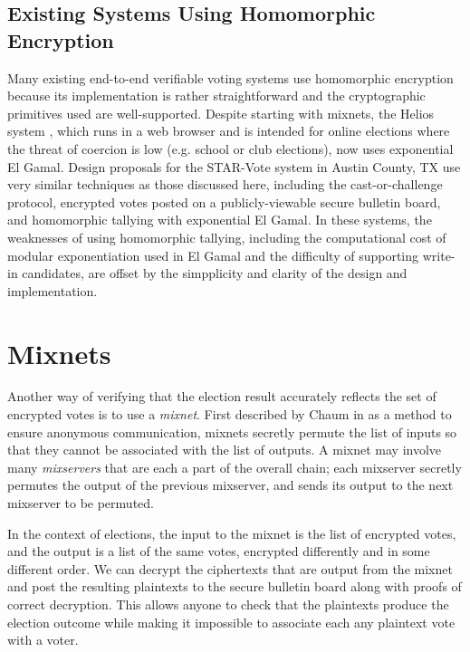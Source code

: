 \subsection{Existing Systems Using Homomorphic Encryption} \label{evote:homomorphic:existing}

Many existing end-to-end verifiable voting systems use homomorphic encryption because its implementation is rather straightforward and the cryptographic primitives used are well-supported. Despite starting with mixnets, the Helios system \cite{adida-helios}, which runs in a web browser and is intended for online elections where the threat of coercion is low (e.g. school or club elections), now uses exponential El Gamal. Design proposals for the STAR-Vote system in Austin County, TX \cite{starvote} use very similar techniques as those discussed here, including the cast-or-challenge protocol, encrypted votes posted on a publicly-viewable secure bulletin board, and homomorphic tallying with exponential El Gamal. In these systems, the weaknesses of using homomorphic tallying, including the computational cost of modular exponentiation used in El Gamal and the difficulty of supporting write-in candidates, are offset by the simpplicity and clarity of the design and implementation.

\section{Mixnets} \label{evote:mixnets}

Another way of verifying that the election result accurately reflects the set of encrypted votes is to use a \emph{mixnet}. First described by Chaum in \cite{chaum81} as a method to ensure anonymous communication, mixnets secretly permute the list of inputs so that they cannot be associated with the list of outputs. A mixnet may involve many \emph{mixservers} that are each a part of the overall chain; each mixserver secretly permutes the output of the previous mixserver, and sends its output to the next mixserver to be permuted.

In the context of elections, the input to the mixnet is the list of encrypted votes, and the output is a list of the same votes, encrypted differently and in some different order. We can decrypt the ciphertexts that are output from the mixnet and post the resulting plaintexts to the secure bulletin board along with proofs of correct decryption. This allows anyone to check that the plaintexts produce the election outcome while making it impossible to associate each any plaintext vote with a voter.

